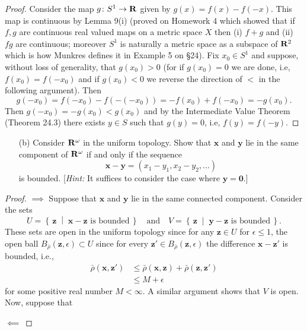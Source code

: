 \begin{proof}
Consider the map $g\colon S^1\to\mathbf{R}$ given by
$g(x)=f(x)-f(-x)$. This map is continuous by Lemma 9(i) (proved on
Homework 4 which showed that if $f,g$ are continuous real valued maps on a
metric space $X$ then (i) $f+g$ and (ii) $fg$ are continuous;
moreover $S^1$ is naturally a metric space as a subspace of
$\mathbf{R}^2$ which is how Munkres defines it in Example 5 on
\S24). Fix $x_0\in S^1$ and suppose, without loss of generality,
that $g(x_0)>0$ (for if $g(x_0)=0$ we are done, i.e,
$f(x_0)=f(-x_0)$ and if $g(x_0)<0$ we reverse the direction of
$<$ in the following argument). Then
\[
g(-x_0)=f(-x_0)-f(-(-x_0))=-f(x_0)+f(-x_0)=-g(x_0).
\]
Then $g(-x_0)=-g(x_0)<g(x_0)$ and by the Intermediate Value
Theorem (Theorem 24.3) there exists $y\in S$ such that $g(y)=0$,
i.e, $f(y)=f(-y)$.
\end{proof}
\newpage
\begin{problem}[Munkres \S25, Ex.\,2(b)]
\begin{enumerate}[noitemsep]
\item[(b)] Consider $\mathbf{R}^\omega$ in the uniform topology. Show
  that $\mathbf{x}$ and $\mathbf{y}$ lie in the same component of
  $\mathbf{R}^\omega$ if and only if the sequence
  \[
    \mathbf{x}-\mathbf{y}=(x_1-y_1,x_2-y_2,...)
  \]
  is bounded. [\emph{Hint:} It suffices to consider the case
  where $\mathbf{y}=\mathbf{0}$.]
\end{enumerate}
\end{problem}
\begin{proof}
$\implies$ Suppose that $\mathbf{x}$ and $\mathbf{y}$ lie in the
same connected component. Consider the sets
\[
U=\left\{\,
\mathbf{z}
\;\middle|\;
\text{$\mathbf{x}-\mathbf{z}$ is bounded}\,\right\}
\quad
\text{and}
\quad
V=\left\{\,\mathbf{z}
\;\middle|\;
\text{$\mathbf{y}-\mathbf{z}$ is bounded}\,\right\}.
\]
These sets are open in the uniform topology since for any
$\mathbf{z}\in U$ for $\epsilon\leq 1$, the open ball
$B_{\bar\rho}(\mathbf{z},\epsilon)\subset U$ since for every
$\mathbf{z}'\in B_{\bar\rho}(\mathbf{z},\epsilon)$ the difference
$\mathbf{x}-\mathbf{z}'$ is bounded, i.e.,
\begin{align*}
\bar\rho(\mathbf{x},\mathbf{z}')
&\leq\bar\rho(\mathbf{x},\mathbf{z})+\bar\rho(\mathbf{z},\mathbf{z}')\\
&\leq M+\epsilon
\end{align*}
for some positive real number $M<\infty$. A similar argument
shows that $V$ is open. Now, suppose that

$\impliedby$
\end{proof}
